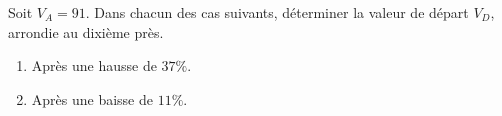 \begin{exo}{}
	Soit $V_A = 91$. Dans chacun des cas suivants, déterminer la valeur de départ $V_D$, arrondie au dixième près.
	\begin{enumerate}
		\item Après une hausse de $37\%$.
		\item Après une baisse de $11\%$.
	\end{enumerate}
\end{exo}
